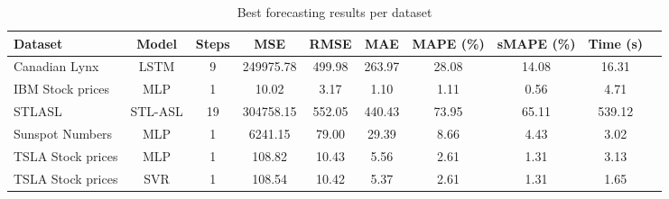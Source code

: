 \begin{table}[htbp]
\centering
\caption{Best forecasting results per dataset}
\label{tab:best_results}
\begin{tabular}{lccccccccc}
\hline
Dataset & Model & Steps & MSE & RMSE & MAE & MAPE (\%) & sMAPE (\%) & Time (s) \\
\hline
Canadian Lynx & LSTM & 9 & 249975.78 & 499.98 & 263.97 & 28.08 & 14.08 & 16.31 \\
IBM Stock prices & MLP & 1 & 10.02 & 3.17 & 1.10 & 1.11 & 0.56 & 4.71 \\
STLASL & STL-ASL & 19 & 304758.15 & 552.05 & 440.43 & 73.95 & 65.11 & 539.12 \\
Sunspot Numbers & MLP & 1 & 6241.15 & 79.00 & 29.39 & 8.66 & 4.43 & 3.02 \\
TSLA Stock prices & MLP & 1 & 108.82 & 10.43 & 5.56 & 2.61 & 1.31 & 3.13 \\
TSLA Stock prices & SVR & 1 & 108.54 & 10.42 & 5.37 & 2.61 & 1.31 & 1.65 \\
\hline
\end{tabular}
\end{table}
